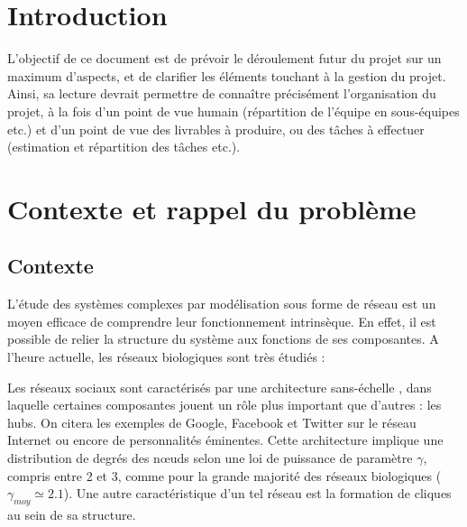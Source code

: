 


\maketitle

\section{Introduction}
L'objectif de ce document est de prévoir le déroulement futur du projet sur un maximum d'aspects, et de clarifier les éléments touchant à la gestion du projet. Ainsi, sa lecture devrait permettre de connaître précisément l'organisation du projet, à la fois d'un point de vue humain (répartition de l'équipe en sous-équipes etc.) et d'un point de vue des livrables à produire, ou des tâches à effectuer (estimation et répartition des tâches etc.).

\section{Contexte et rappel du problème}
\subsection{Contexte}
L'étude des systèmes complexes par modélisation sous forme de réseau est un moyen efficace de comprendre leur fonctionnement intrinsèque. En effet, il est possible de relier la structure du système aux fonctions de ses composantes. A l'heure actuelle, les réseaux biologiques sont très étudiés : 


Les réseaux sociaux sont caractérisés par une architecture \og sans-échelle \fg {}, dans laquelle certaines composantes jouent un rôle plus important que d'autres : les hubs. On citera les exemples de Google, Facebook et Twitter sur le réseau Internet ou encore de personnalités éminentes. Cette architecture implique une distribution de degrés des n\oe uds selon une loi de puissance de paramètre $\gamma$, compris entre 2 et 3, comme pour la grande majorité des réseaux biologiques ($\gamma_{moy}\simeq 2.1$). Une autre caractéristique d'un tel réseau est la formation de cliques au sein de sa structure.

